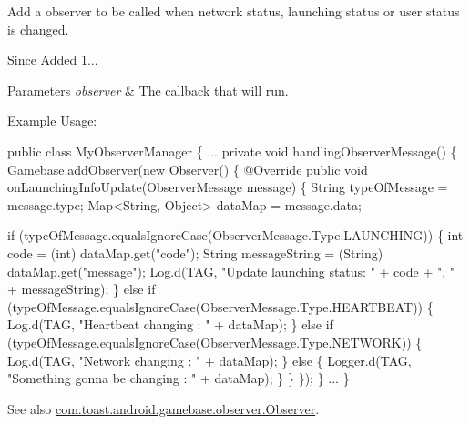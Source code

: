 Add a observer to be called when network status, launching status or user status is changed. 

\begin{DoxySince}{Since}
Added 1... 
\end{DoxySince}

\begin{DoxyParams}{Parameters}
{\em observer} & The callback that will run.\\
\hline
\end{DoxyParams}
Example Usage\+: 
\begin{DoxyCode}
\textcolor{keyword}{public} \textcolor{keyword}{class }MyObserverManager \{
    ...
    \textcolor{keyword}{private} \textcolor{keywordtype}{void} handlingObserverMessage() \{
        Gamebase.addObserver(\textcolor{keyword}{new} Observer() \{
             @Override
             \textcolor{keyword}{public} \textcolor{keywordtype}{void} onLaunchingInfoUpdate(ObserverMessage message) \{
                 String typeOfMessage = message.type;
                 Map<String, Object> dataMap = message.data;

                 \textcolor{keywordflow}{if} (typeOfMessage.equalsIgnoreCase(ObserverMessage.Type.LAUNCHING)) \{
                     \textcolor{keywordtype}{int} code = (int) dataMap.get(\textcolor{stringliteral}{"code"});
                     String messageString = (String) dataMap.get(\textcolor{stringliteral}{"message"});
                     Log.d(TAG, \textcolor{stringliteral}{"Update launching status: "} + code + \textcolor{stringliteral}{", "} + messageString);
                 \} \textcolor{keywordflow}{else} \textcolor{keywordflow}{if} (typeOfMessage.equalsIgnoreCase(ObserverMessage.Type.HEARTBEAT)) \{
                     Log.d(TAG, \textcolor{stringliteral}{"Heartbeat changing : "} + dataMap);
                 \} \textcolor{keywordflow}{else} \textcolor{keywordflow}{if} (typeOfMessage.equalsIgnoreCase(ObserverMessage.Type.NETWORK)) \{
                     Log.d(TAG, \textcolor{stringliteral}{"Network changing : "} + dataMap);
                 \} \textcolor{keywordflow}{else} \{
                     Logger.d(TAG, \textcolor{stringliteral}{"Something gonna be changing : "} + dataMap);
                 \}
             \}
         \});
     \}
     ...
\}
\end{DoxyCode}


\begin{DoxySeeAlso}{See also}
\hyperlink{interfacecom_1_1toast_1_1android_1_1gamebase_1_1observer_1_1_observer}{com.\+toast.\+android.\+gamebase.\+observer.\+Observer}. 
\end{DoxySeeAlso}
\mbox{\label{classcom_1_1toast_1_1android_1_1gamebase_1_1_gamebase_a1cae88da5b12ad9563fbfa619870f11b}} 
